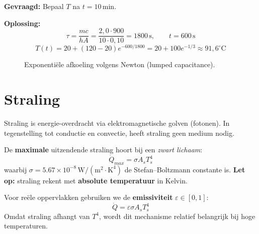 \documentclass[a4paper,11pt,twoside]{report}
\begin{document}
            	\textbf{Gevraagd:} Bepaal $T$ na $t=10\,\mathrm{min}$.

            	\textbf{Oplossing:}
\[
            	\tau=\frac{mc}{hA}=\frac{2{,}0\cdot 900}{10\cdot 0{,}10}=1800\,\mathrm{s},\qquad t=600\,\mathrm{s}
\]
\[
T(t)=20+(120-20)e^{-600/1800}=20+100e^{-1/3}\approx 91{,}6^\circ\mathrm{C}
\]

\begin{figure}[H]
    \centering
    \caption{Exponentiële afkoeling volgens Newton (lumped capacitance).}
\end{figure}

\section{Straling}
Straling is energie-overdracht via elektromagnetische golven (fotonen). 
In tegenstelling tot conductie en convectie, 
heeft straling geen medium nodig.

De \textbf{maximale} uitzendende straling hoort bij een \textit{zwart lichaam}:
\[
\dot{Q}_{max} = \sigma A_s T_s^4
\]
waarbij $\sigma = 5.67 \times 10^{-8}\,\mathrm{W/(m^2\cdot K^4)}$ de Stefan--Boltzmann constante is. \textbf{Let op:} straling rekent met \textbf{absolute temperatuur} in Kelvin.

Voor reële oppervlakken gebruiken we de \textbf{emissiviteit} $\varepsilon\in[0,1]$:
\[
\dot{Q} = \varepsilon\sigma A_s T_s^4
\]
Omdat straling afhangt van $T^4$, wordt dit mechanisme relatief belangrijk bij hoge temperaturen.
\end{document}
